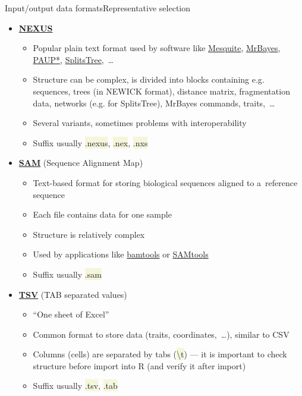 \documentclass[compress, ucs, xelatex, 11pt, xcolor=svgnames, aspectratio=169,
	hyperref={
		bookmarks=true,
		unicode=true,
		colorlinks=true,
		pdftitle={Molecular data in R},
		plainpages=false,
		pdfauthor={Vojtech Zeisek},
		pdfsubject={Course about phylogeny and evolution in R},
		pdfcreator={XeLaTeX},
		pdfkeywords={R, evolution, phylogeny, molecular data},
		linkcolor=Crimson, %
		anchorcolor=Magenta, %
		citecolor=Magenta, %
		filecolor=Magenta, %
		menucolor=Magenta, %
		urlcolor=DodgerBlue, %
		pdftex},
	url={hyphens, lowtilde} %
	]{beamer}
\renewcommand{\texttt}[1]{\colorbox{Beige}{{\ttfamily #1}}}
\begin{document}
\begin{frame}[allowframebreaks]{Input/output data formats}{Representative selection}
\begin{itemize}
\begin{itemize}
		\end{itemize}
		\item \href{https://en.wikipedia.org/wiki/Nexus_file}{\textbf{NEXUS}}
		\begin{itemize}
			\item Popular plain text format used by software like \href{https://mesquiteproject.org/}{Mesquite}, \href{https://nbisweden.github.io/MrBayes/}{MrBayes}, \href{https://paup.phylosolutions.com/}{PAUP*}, \href{http://www.splitstree.org/}{SplitsTree},~\ldots
			\item Structure can be complex, is divided into blocks containing e.g. sequences, trees (in NEWICK format), distance matrix, fragmentation data, networks (e.g. for SplitsTree), MrBayes commands, traits,~\ldots
			\item Several variants, sometimes problems with interoperability
			\item Suffix usually \texttt{*.nexus}, \texttt{*.nex}, \texttt{*.nxs}
		\end{itemize}
		\item \href{https://en.wikipedia.org/wiki/SAM_(file_format)}{\textbf{SAM}} (Sequence Alignment Map)
		\begin{itemize}
			\item Text-based format for storing biological sequences aligned to a~reference sequence
			\item Each file contains data for one sample
			\item Structure is relatively complex
			\item Used by applications like \href{https://github.com/pezmaster31/bamtools/wiki}{bamtools} or \href{https://www.htslib.org/}{SAMtools}
			\item Suffix usually \texttt{*.sam}
		\end{itemize}
		\item \href{https://en.wikipedia.org/wiki/Tab-separated_values}{\textbf{TSV}} (TAB separated values)
		\begin{itemize}
			\item \enquote{One sheet of Excel}
			\item Common format to store data (traits, coordinates,~\ldots), similar to CSV
			\item Columns (cells) are separated by tabs (\texttt{\textbackslash t}) --- it is important to check structure before import into R (and verify it after import)
			\item Suffix usually \texttt{*.tsv}, \texttt{*.tab}
		\end{itemize}

\end{itemize}
\end{frame}
\end{document}
